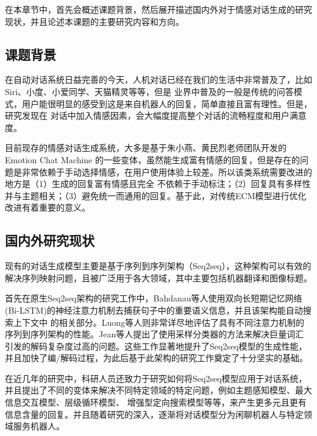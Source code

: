 \documentclass[supercite]{HustGraduPaper}
\theoremstyle{definition}
\begin{document}
在本章节中，首先会概述课题背景，然后展开描述国内外对于情感对话生成的研究现状，并且论述本课题的主要研究内容和方向。

\subsection{课题背景}
在自动对话系统日益完善的今天，人机对话已经在我们的生活中非常普及了，比如Siri、小度、小爱同学、天猫精灵等等，但是
业界中普及的一般是传统的问答模式，用户能很明显的感受到这是来自机器人的回复，简单直接且富有理性。但是，研究发现在
对话中加入情感因素，会大幅度提高整个对话的流畅程度和用户满意度。

目前现存的情感对话生成系统，大多是基于朱小燕、黄民烈老师团队开发的Emotion Chat Machine\cite{DBLP:journals/corr/ZhouHZZL17}
的一些变体，虽然能生成富有情感的回复，但是存在的问题是非常依赖于手动选择情感，在用户使用体验上较差。所以该类系统需要改进的地方是（1）生成的回复富有情感且完全
不依赖于手动标注；（2）回复具有多样性并与主题相关；（3）避免统一而通用的回复。基于此，对传统ECM模型进行优化改进有着重要的意义。

\subsection{国内外研究现状}

现有的对话生成模型主要是基于序列到序列架构（Seq2seq），这种架构可以有效的解决序列映射问题，且被广泛用于各大领域，其中主要包括机器翻译和图像标题。

首先在原生Seq2seq架构的研究工作中，Bahdanau\cite{bahdanau2014neural}等人使用双向长短期记忆网络(Bi-LSTM)的神经注意力机制去捕获句子中的重要语义信息，并且该架构能自动搜索上下文中
的相关部分。Luong\cite{luong2015effective}等人则非常详尽地评估了具有不同注意力机制的序列到序列架构的性能。Jean\cite{jean2014using}等人提出了使用采样分类器的方法来解决巨量词汇
引发的解码复杂度过高的问题。这些工作显著地提升了Seq2seq模型的生成性能，并且加快了编/解码过程，为此后基于此架构的研究工作奠定了十分坚实的基础。

在近几年的研究中，科研人员还致力于研究如何将Seq2seq模型应用于对话系统，并且提出了不同的变体来解决不同特定领域的特定问题，例如主题感知模型、最大信息交互模型、层级循环模型、
增强型定向搜索模型等等，来产生更多元且更有信息含量的回复。并且随着研究的深入，逐渐将对话模型分为闲聊机器人与特定领域服务机器人。
\end{document}
